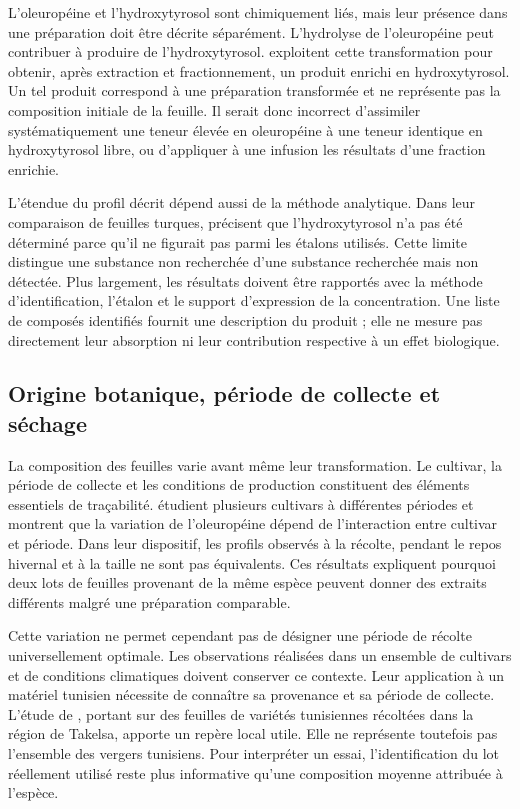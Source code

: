 L'oleuropéine et l'hydroxytyrosol sont chimiquement liés, mais leur présence dans une préparation doit être décrite séparément. L'hydrolyse de l'oleuropéine peut contribuer à produire de l'hydroxytyrosol. \citet{Papageorgiou2022} exploitent cette transformation pour obtenir, après extraction et fractionnement, un produit enrichi en hydroxytyrosol. Un tel produit correspond à une préparation transformée et ne représente pas la composition initiale de la feuille. Il serait donc incorrect d'assimiler systématiquement une teneur élevée en oleuropéine à une teneur identique en hydroxytyrosol libre, ou d'appliquer à une infusion les résultats d'une fraction enrichie.

L'étendue du profil décrit dépend aussi de la méthode analytique. Dans leur comparaison de feuilles turques, \citet{Koyuncu2026} précisent que l'hydroxytyrosol n'a pas été déterminé parce qu'il ne figurait pas parmi les étalons utilisés. Cette limite distingue une substance non recherchée d'une substance recherchée mais non détectée. Plus largement, les résultats doivent être rapportés avec la méthode d'identification, l'étalon et le support d'expression de la concentration. Une liste de composés identifiés fournit une description du produit ; elle ne mesure pas directement leur absorption ni leur contribution respective à un effet biologique.

\subsection{Origine botanique, période de collecte et séchage}

La composition des feuilles varie avant même leur transformation. Le cultivar, la période de collecte et les conditions de production constituent des éléments essentiels de traçabilité. \citet{Paskovic2025} étudient plusieurs cultivars à différentes périodes et montrent que la variation de l'oleuropéine dépend de l'interaction entre cultivar et période. Dans leur dispositif, les profils observés à la récolte, pendant le repos hivernal et à la taille ne sont pas équivalents. Ces résultats expliquent pourquoi deux lots de feuilles provenant de la même espèce peuvent donner des extraits différents malgré une préparation comparable.

Cette variation ne permet cependant pas de désigner une période de récolte universellement optimale. Les observations réalisées dans un ensemble de cultivars et de conditions climatiques doivent conserver ce contexte. Leur application à un matériel tunisien nécessite de connaître sa provenance et sa période de collecte. L'étude de \citet{Mechi2023}, portant sur des feuilles de variétés tunisiennes récoltées dans la région de Takelsa, apporte un repère local utile. Elle ne représente toutefois pas l'ensemble des vergers tunisiens. Pour interpréter un essai, l'identification du lot réellement utilisé reste plus informative qu'une composition moyenne attribuée à l'espèce.

